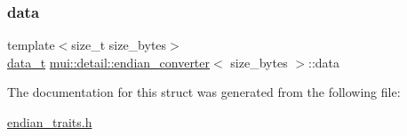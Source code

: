 \subsubsection{\texorpdfstring{data}{data}}
{\footnotesize\ttfamily template$<$size\+\_\+t size\+\_\+bytes$>$ \\
\hyperlink{unionmui_1_1detail_1_1endian__converter_1_1data__t}{data\+\_\+t} \hyperlink{structmui_1_1detail_1_1endian__converter}{mui\+::detail\+::endian\+\_\+converter}$<$ size\+\_\+bytes $>$\+::data}



The documentation for this struct was generated from the following file\+:\begin{DoxyCompactItemize}
\item 
\hyperlink{endian__traits_8h}{endian\+\_\+traits.\+h}\end{DoxyCompactItemize}
